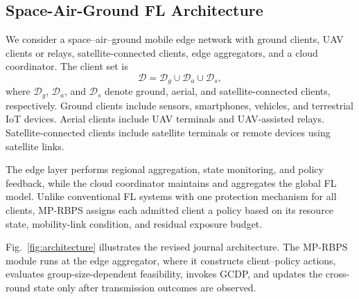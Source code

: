 \documentclass[preprint,12pt]{elsarticle}
\begin{document}
\subsection{Space-Air-Ground FL Architecture}

We consider a space--air--ground mobile edge network with ground clients, UAV clients or relays, satellite-connected clients, edge aggregators, and a cloud coordinator. The client set is
\begin{equation}
	\mathcal{D} = \mathcal{D}_{g} \cup \mathcal{D}_{a} \cup \mathcal{D}_{s},
\end{equation}
where $\mathcal{D}_{g}$, $\mathcal{D}_{a}$, and $\mathcal{D}_{s}$ denote ground, aerial, and satellite-connected clients, respectively. Ground clients include sensors, smartphones, vehicles, and terrestrial IoT devices. Aerial clients include UAV terminals and UAV-assisted relays. Satellite-connected clients include satellite terminals or remote devices using satellite links.

The edge layer performs regional aggregation, state monitoring, and policy feedback, while the cloud coordinator maintains and aggregates the global FL model. Unlike conventional FL systems with one protection mechanism for all clients, MP-RBPS assigns each admitted client a policy based on its resource state, mobility-link condition, and residual exposure budget.

Fig.~\ref{fig:architecture} illustrates the revised journal architecture. The MP-RBPS module runs at the edge aggregator, where it constructs client--policy actions, evaluates group-size-dependent feasibility, invokes GCDP, and updates the cross-round state only after transmission outcomes are observed.
\end{document}
